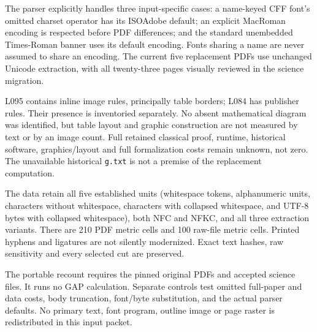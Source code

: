 \documentclass[11pt,a4paper]{article}
\begin{document}
 The parser explicitly handles three input-specific cases: a name-keyed CFF
 font's omitted charset operator has its ISOAdobe default; an explicit
 MacRoman encoding is respected before PDF differences; and the standard
 unembedded Times-Roman banner uses its default encoding. Fonts sharing a
 name are never assumed to share an encoding. The current five replacement
 PDFs use unchanged Unicode extraction, with all twenty-three pages visually
 reviewed in the science migration.

 L095 contains inline image rules, principally table borders; L084 has
 publisher rules. Their presence is inventoried separately. No absent
 mathematical diagram was identified, but table layout and graphic construction
 are not measured by text or by an image count. Full retained classical proof,
 runtime, historical software, graphics/layout and full formalization costs
 remain unknown, not zero. The unavailable historical \texttt{g.txt} is not a
 premise of the replacement computation.

 The data retain all five established units (whitespace tokens, alphanumeric
 units, characters without whitespace, characters with collapsed whitespace,
 and UTF-8 bytes with collapsed whitespace), both NFC and NFKC, and all three
 extraction variants. There are 210 PDF metric cells and 100 raw-file metric
 cells. Printed hyphens and ligatures are not silently modernized. Exact text
 hashes, raw sensitivity and every selected cut are preserved.

 The portable recount requires the pinned original PDFs and accepted science
 files. It runs no GAP calculation. Separate controls test omitted full-paper
 and data costs, body truncation, font/byte substitution, and the actual parser
 defaults. No primary text, font program, outline image or page raster is
 redistributed in this input packet.
 
\end{document}
